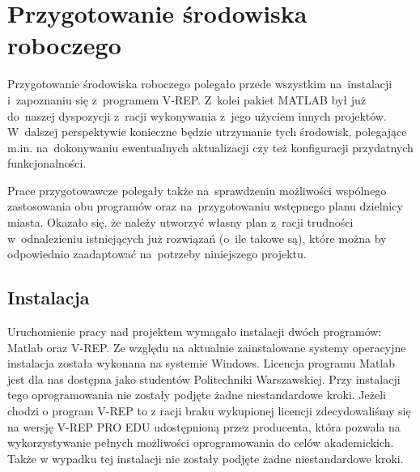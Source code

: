 \documentclass[11pt, a4paper, twoside]{article}
\begin{document}
\section{Przygotowanie środowiska roboczego}
\label{sec:przygotowanie}
Przygotowanie środowiska roboczego polegało przede wszystkim na~instalacji i~zapoznaniu się z~programem V-REP. Z~kolei pakiet MATLAB był już do~naszej dyspozycji z~racji wykonywania z~jego użyciem innych projektów. W~dalszej perspektywie konieczne będzie utrzymanie tych środowisk,  polegające m.in. na~dokonywaniu ewentualnych aktualizacji czy też konfiguracji przydatnych funkcjonalności.

Prace przygotowawcze polegały także na~sprawdzeniu możliwości wspólnego zastosowania obu programów oraz na~przygotowaniu wstępnego planu dzielnicy miasta. Okazało się, że należy utworzyć własny plan z~racji trudności w~odnalezieniu istniejących już rozwiązań (o~ile takowe są), które można by odpowiednio zaadaptować na~potrzeby niniejszego projektu.

\subsection{Instalacja}
\label{subsec:instalacja}
Uruchomienie pracy nad projektem wymagało instalacji dwóch programów: Matlab oraz V-REP. Ze względu na aktualnie zainstalowane systemy operacyjne instalacja została wykonana na systemie Windows. Licencja programu Matlab jest dla nas dostępna jako studentów Politechniki Warszawskiej. Przy instalacji tego oprogramowania nie zostały podjęte żadne niestandardowe kroki. Jeżeli chodzi o program V-REP to z racji braku wykupionej licencji zdecydowaliśmy się na wersję V-REP PRO EDU udostępnioną przez producenta, która pozwala na wykorzystywanie pełnych możliwości oprogramowania do celów akademickich. Także w wypadku tej instalacji nie zostały podjęte żadne niestandardowe kroki.
\end{document}
